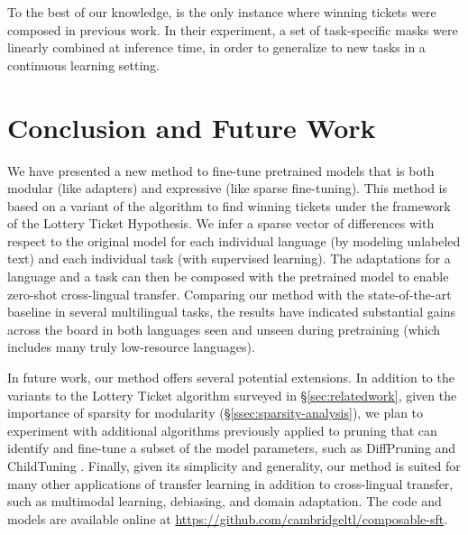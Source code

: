 To the best of our knowledge, \citet{NEURIPS2020_ad1f8bb9} is the only instance where winning tickets were composed in previous work. In their experiment, a set of task-specific masks were linearly combined at inference time, in order to generalize to new tasks in a continuous learning setting.

\section{Conclusion and Future Work} We have presented a new method to fine-tune pretrained models that is both modular (like adapters) and expressive (like sparse fine-tuning). This method is based on a variant of the algorithm to find winning tickets under the framework of the Lottery Ticket Hypothesis. We infer a sparse vector of differences with respect to the original model for each individual language (by modeling unlabeled text) and each individual task (with supervised learning). The adaptations for a language and a task can then be composed with the pretrained model to enable zero-shot cross-lingual transfer. Comparing our method with the state-of-the-art baseline in several multilingual tasks, the results have indicated substantial gains across the board in both languages seen and unseen during pretraining (which includes many truly low-resource languages). 

In future work, our method offers several potential extensions. In addition to the variants to the Lottery Ticket algorithm surveyed in \S\ref{sec:relatedwork}, given the importance of sparsity for modularity (\S\ref{ssec:sparsity-analysis}), we plan to experiment with additional algorithms previously applied to pruning that can identify and fine-tune a subset of the model parameters, such as DiffPruning \citep{guo-etal-2021-parameter} and ChildTuning \citep{xu-etal-2021-raise}. Finally, given its simplicity and generality, our method is suited for many other applications of transfer learning in addition to cross-lingual transfer, such as multimodal learning, debiasing, and domain adaptation. The code and models are available online at \url{https://github.com/cambridgeltl/composable-sft}.


